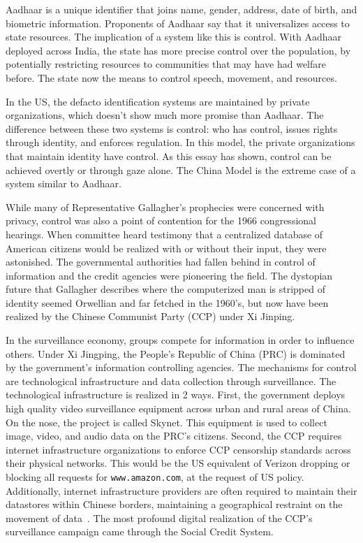 Aadhaar is a unique identifier that joins name, gender, address, date of birth,
and biometric information. Proponents of Aadhaar say that it universalizes
access to state resources. The implication of a system like this is control.
With Aadhaar deployed across India, the state has more precise control over the
population, by potentially restricting resources to communities that may have
had welfare before. The state now the means to control speech, movement, and
resources.

In the US, the defacto identification systems are maintained by private
organizations, which doesn't show much more promise than Aadhaar. The
difference between these two systems is control: who has control, issues
rights through identity, and enforces regulation. In this model, the private
organizations that maintain identity have control. As this essay has shown,
control can be achieved overtly or through gaze alone. The China Model is the
extreme case of a system similar to Aadhaar.

While many of Representative Gallagher's prophecies were concerned with
privacy, control was also a point of contention for the 1966 congressional
hearings. When committee heard testimony that a centralized database of
American citizens would be realized with or without their input, they were
astonished. The governmental authorities had fallen behind in control of
information and the credit agencies were pioneering the field. The dystopian
future that Gallagher describes where the computerized man is stripped of
identity seemed Orwellian and far fetched in the 1960's, but now have been
realized by the Chinese Communist Party (CCP) under Xi Jinping.

In the surveillance economy, groups compete for information in order to
influence others. Under Xi Jingping, the People's Republic of China (PRC) is
dominated by the government's information controlling agencies. The mechanisms
for control are technological infrastructure and data collection through
surveillance. The technological infrastructure is realized in 2 ways. First,
the government deploys high quality video surveillance equipment across urban
and rural areas of China. On the nose, the project is called Skynet. This
equipment is used to collect image, video, and audio data on the PRC's
citizens. Second, the CCP requires internet infrastructure organizations to
enforce CCP censorship standards across their physical networks. This would be the
US equivalent of Verizon dropping or blocking all requests for
\texttt{www.amazon.com}, at the request of US policy. Additionally, internet infrastructure providers are
often required to maintain their datastores within Chinese borders, maintaining
a geographical restraint on the movement of data~\cite{qiang2019road}. The most
profound digital realization of the CCP's surveillance campaign came through
the Social Credit System.

